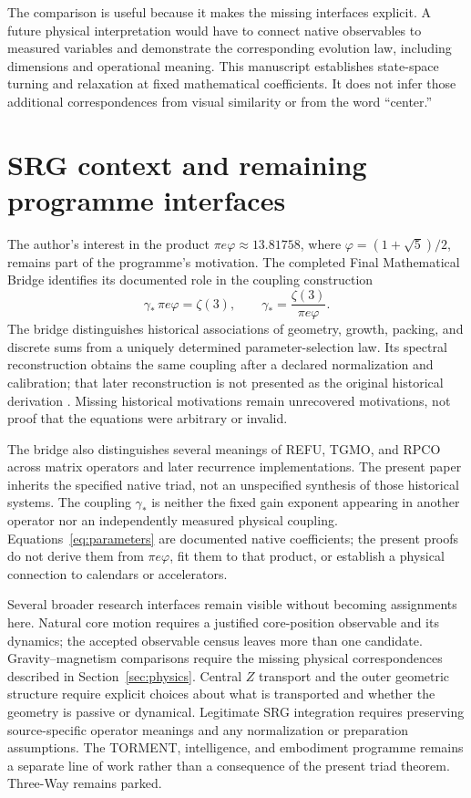 \documentclass[11pt,a4paper]{article}
\numberwithin{equation}{section}
\theoremstyle{remark}\newtheorem{remark}[theorem]{Remark}
\begin{document}
The comparison is useful because it makes the missing interfaces explicit. A future physical interpretation would have to connect native observables to measured variables and demonstrate the corresponding evolution law, including dimensions and operational meaning. This manuscript establishes state-space turning and relaxation at fixed mathematical coefficients. It does not infer those additional correspondences from visual similarity or from the word ``center.''

\section{SRG context and remaining programme interfaces}\label{sec:srg}

The author's interest in the product $\pi e\varphi\approx13.81758$, where $\varphi=(1+\sqrt5)/2$, remains part of the programme's motivation. The completed Final Mathematical Bridge identifies its documented role in the coupling construction
\begin{equation}
\gamma_*\,\pi e\varphi=\zeta(3),\qquad
\gamma_*=\frac{\zeta(3)}{\pi e\varphi}.\label{eq:srg}
\end{equation}
The bridge distinguishes historical associations of geometry, growth, packing, and discrete sums from a uniquely determined parameter-selection law. Its spectral reconstruction obtains the same coupling after a declared normalization and calibration; that later reconstruction is not presented as the original historical derivation \cite[\S6, equation S7]{bridge}. Missing historical motivations remain unrecovered motivations, not proof that the equations were arbitrary or invalid.

The bridge also distinguishes several meanings of REFU, TGMO, and RPCO across matrix operators and later recurrence implementations. The present paper inherits the specified native triad, not an unspecified synthesis of those historical systems. The coupling $\gamma_*$ is neither the fixed gain exponent appearing in another operator nor an independently measured physical coupling. Equations~\eqref{eq:parameters} are documented native coefficients; the present proofs do not derive them from $\pi e\varphi$, fit them to that product, or establish a physical connection to calendars or accelerators.

Several broader research interfaces remain visible without becoming assignments here. Natural core motion requires a justified core-position observable and its dynamics; the accepted observable census leaves more than one candidate. Gravity--magnetism comparisons require the missing physical correspondences described in Section~\ref{sec:physics}. Central $Z$ transport and the outer geometric structure require explicit choices about what is transported and whether the geometry is passive or dynamical. Legitimate SRG integration requires preserving source-specific operator meanings and any normalization or preparation assumptions. The TORMENT, intelligence, and embodiment programme remains a separate line of work rather than a consequence of the present triad theorem. Three-Way remains parked.
\end{document}
